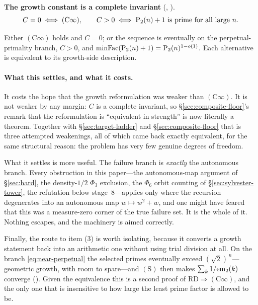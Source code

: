 \begin{keyresult}
\textbf{The growth constant is a complete invariant}
(,
 ).
\[
  C = 0 \iff (\mathrm{C}\infty),
  \qquad
  C > 0 \iff \mathrm{P}_{2}(n)+1 \text{ is prime for all large } n .
\]
\end{keyresult}

\begin{theorem}
\label{thm:defect-dichotomy}
Either $(\mathrm{C}\infty)$ holds and $C = 0$; or the sequence is
eventually on the perpetual-primality branch, $C > 0$, and
$\mathrm{minFac}(\mathrm{P}_{2}(n)+1) = \mathrm{P}_{2}(n)^{1-o(1)}$.  Each alternative is
equivalent to its growth-side description.
\end{theorem}

\paragraph{What this settles, and what it costs.}
It costs the hope that the growth reformulation was weaker than
$(\mathrm{C}\infty)$.  It is not weaker by any margin: $C$ is a complete
invariant, so \S\ref{sec:composite-floor}'s remark that the reformulation
is ``equivalent in strength'' is now literally a theorem.  Together with
\S\ref{sec:target-ladder} and \S\ref{sec:composite-floor} that is three
attempted weakenings, all of which came back exactly equivalent, for the
same structural reason: the problem has very few genuine degrees of
freedom.

What it settles is more useful.  The failure branch is \emph{exactly} the
autonomous branch.  Every obstruction in this paper---the autonomous-map
argument of \S\ref{sec:hard}, the density-$1/2$ $\Phi_3$ exclusion, the
$\Phi_6$ orbit counting of \S\ref{sec:sylvester-tower}, the refutation
below stage~$8$---applies only where the recursion degenerates into an
autonomous map $w \mapsto w^2+w$, and one might have feared that this was
a measure-zero corner of the true failure set.  It is the whole of it.
Nothing escapes, and the machinery is aimed correctly.

Finally, the route to item (3) is worth isolating, because it converts a
growth statement back into an arithmetic one without using trial division
at all.  On the branch \eqref{eq:near-perpetual} the selected primes
eventually exceed $(\sqrt 2)^{\,n}$---geometric growth, with room to
spare---and $(\mathrm{S})$ then makes $\sum_k 1/\mathrm{em}_{2}(k)$ converge
().
Given the equivalence this is a second proof of $\mathrm{RD} \Rightarrow
(\mathrm{C}\infty)$, and the only one that is insensitive to how large the
least prime factor is allowed to be.

